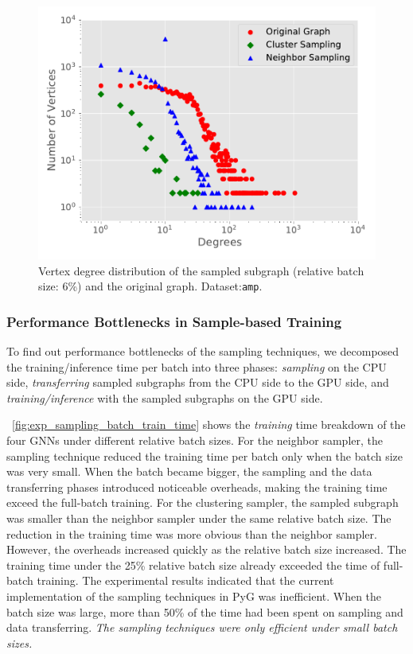 \begin{figure}[H]
    \centering
    \includegraphics[width=0.4\columnwidth]{figs/experiments/exp_sampling_minibatch_degrees_distribution_amazon-photo.pdf}
    \caption{Vertex degree distribution of the sampled subgraph (relative batch size: 6\%) and the original graph. Dataset:\texttt{amp}.}
    \label{fig:exp_sampling_minibatch_degrees_distribution}
\end{figure}

\subsubsection{Performance Bottlenecks in Sample-based Training}

To find out performance bottlenecks of the sampling techniques, we decomposed the training/inference time per batch into three phases: \emph{sampling} on the CPU side, \emph{transferring} sampled subgraphs from the CPU side to the GPU side, and \emph{training/inference} with the sampled subgraphs on the GPU side.

\figurename~\ref{fig:exp_sampling_batch_train_time} shows the \emph{training} time breakdown of the four GNNs under different relative batch sizes.
%
For the neighbor sampler, the sampling technique reduced the training time per batch only when the batch size was very small.
%
When the batch became bigger, the sampling and the data transferring phases introduced noticeable overheads, making the training time exceed the full-batch training.
%
For the clustering sampler, the sampled subgraph was smaller than the neighbor sampler under the same relative batch size.
%
The reduction in the training time was more obvious than the neighbor sampler.
%
However, the overheads increased quickly as the relative batch size increased.
%
The training time under the 25\% relative batch size already exceeded the time of full-batch training.
%
The experimental results indicated that the current implementation of the sampling techniques in PyG was inefficient.
%
When the batch size was large, more than 50\% of the time had been spent on sampling and data transferring.
%
\emph{The sampling techniques were only efficient under small batch sizes.}


